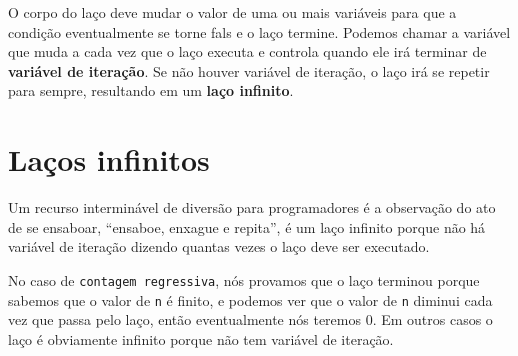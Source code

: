 

O corpo do laço deve mudar o valor de uma ou mais variáveis para que a
condição eventualmente se torne fals e o laço termine. Podemos chamar a
variável que muda a cada vez que o laço executa e controla quando ele irá
terminar de {\bf variável de iteração}. Se não houver variável de iteração,
o laço irá se repetir para sempre, resultando em um {\bf laço infinito}.

\section{Laços infinitos}


Um recurso interminável de diversão para programadores é a observação do ato
de se ensaboar, ``ensaboe, enxague e repita'', é um laço infinito porque não
há variável de iteração dizendo quantas vezes o laço deve ser executado.



No caso de {\tt contagem regressiva}, nós provamos que o laço terminou porque
sabemos que o valor de {\tt n} é finito, e podemos ver que o valor de {\tt n}
diminui cada vez que passa pelo laço, então eventualmente nós teremos 0. Em
outros casos o laço é obviamente infinito porque não tem variável de iteração.

